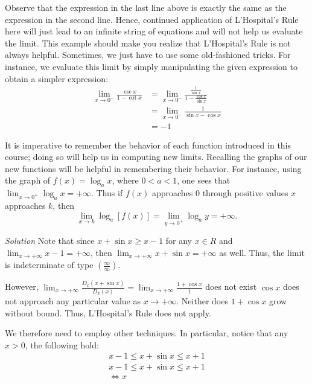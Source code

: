 \documentclass[
  letterpaper,
  DIV=11,
  numbers=noendperiod]{scrartcl}
\theoremstyle{definition}
\theoremstyle{plain}
\theoremstyle{remark}
\begin{document}
Observe that the expression in the last line above is exactly the same
as the expression in the second line. Hence, continued application of
L'Hospital's Rule here will just lead to an infinite string of equations
and will not help us evaluate the limit. This example should make you
realize that L'Hospital's Rule is not always helpful. Sometimes, we just
have to use some old-fashioned tricks. For instance, we evaluate this
limit by simply manipulating the given expression to obtain a simpler
expression: \[
\begin{aligned}
\displaystyle\lim_{x \to 0^-}\frac{\csc x}{1-\cot x}&=\displaystyle\lim_{x \to 0^-}\frac{\frac{1}{\sin x}}{1-\frac{\cos x}{\sin x}}\\&=\displaystyle\lim_{x \to 0^-}\frac{1}{\sin x-\cos x}\\&=-1
\end{aligned}
\]

It is imperative to remember the behavior of each function introduced in
this course; doing so will help us in computing new limits. Recalling
the graphs of our new functions will be helpful in remembering their
behavior. For instance, using the graph of \(f(x)=\log_a x\), where
\(0\lt a \lt 1\), one sees that
\(\displaystyle\lim_{x \to 0^+}\log_a x=+\infty\). Thus if \(f(x)\)
approaches \(0\) through positive values \(x\) approaches \(k\), then \[
\displaystyle\lim_{x \to k}\log_a[f(x)]=\displaystyle\lim_{y \to 0^+}\log_a y=+\infty.
\]

\leavevmode{}%
\emph{Solution} Note that since \(x+\sin x \ge x - 1\) for any
\(x \in R\) and \(\displaystyle\lim_{x \to +\infty} {x-1=+\infty}\),
then \(\displaystyle\lim_{x \to +\infty}{x + \sin x = +\infty}\) as
well. Thus, the limit is indeterminate of type
\(\left(\frac{\infty}{\infty}\right)\).

However,
\(\displaystyle\lim_{x \to +\infty}{\frac{D_x(x+\sin x)}{D_x(x)}=\displaystyle\lim_{x \to +\infty}\frac{1+\cos x}{1}}\)
does not exist \(\cos x\) does not approach any particular value as
\(x\to +\infty\). Neither does \(1+\cos x\) grow without bound. Thus,
L'Hospital's Rule does not apply.

We therefore need to employ other techniques. In particular, notice that
any \(x\gt 0\), the following hold: \[
\begin{aligned}
x-1 \le x+\sin x \le x+1 \\
x-1 \le x+\sin x \le x+1\\
\iff x
\end{aligned}
\]
\end{document}
